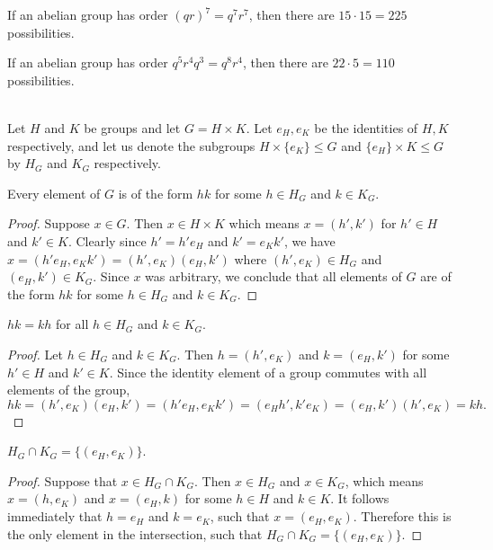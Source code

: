 \documentclass{article}
\newenvironment{problem2}[1]{\noindent {\bf (#1}}
{\medskip}
\newenvironment{problem1}[1]{\noindent {\bf Problem #1:}}
{\medskip}
\begin{document}
\begin{problem2}{ii)} If an abelian group has order $(qr)^7=q^7r^7$, then there are $15\cdot15=225$ possibilities.
\end{problem2}

\begin{problem2}{iii)} If an abelian group has order $q^5r^4q^3=q^8r^4$, then there are $22\cdot5=110$ possibilities.\\
\end{problem2}


\begin{problem1}{50} \\ Let $H$ and $K$ be groups and let $G=H\times K$. Let $e_H,e_K$ be the identities of $H, K$ respectively, and let us denote the subgroups $H\times\{e_K\}\le G$ and $\{e_H\}\times K\le G$ by $H_G$ and $K_G$ respectively. \\\end{problem1}



\begin{problem2}{a)} Every element of $G$ is of the form $hk$ for some $h\in H_G$ and $k\in K_G$.
\end{problem2}

\begin{proof} Suppose $x\in G$. Then $x\in H\times K$ which means $x=(h',k')$ for $h'\in H$ and $k'\in K$. Clearly since $h'=h'e_H$ and $k'=e_Kk'$, we have $x=(h'e_H, e_Kk')=(h',e_K)(e_H,k')$ where $(h',e_K)\in H_G$ and $(e_H,k')\in K_G$. Since $x$ was arbitrary, we conclude that all elements of $G$ are of the form $hk$ for some $h\in H_G$ and $k\in K_G$.
\end{proof}

\begin{problem2}{b)} $hk=kh$ for all $h\in H_G$ and $k\in K_G$.
\end{problem2}

\begin{proof} Let $h\in H_G$ and $k\in K_G$. Then $h=(h',e_K)$ and $k=(e_H,k')$ for some $h'\in H$ and $k'\in K$. Since the identity element of a group commutes with all elements of the group, $$hk=(h',e_K)(e_H,k')=(h'e_H,e_Kk')=(e_Hh', k'e_K)=(e_H,k')(h',e_K)=kh.$$ \end{proof}

\begin{problem2}{c)} $H_G \cap K_G = \{(e_H,e_K)\}$.
\end{problem2}

\begin{proof} Suppose that $x\in H_G \cap K_G $. Then $x\in H_G$ and $x\in K_G$, which means $x=(h,e_K)$ and $x=(e_H,k)$ for some $h\in H$ and $k\in K$. It follows immediately that $h=e_H$ and $k=e_K$, such that $x=(e_H,e_K)$. Therefore this is the only element in the intersection, such that $H_G \cap K_G = \{(e_H,e_K)\}$.
\end{proof}
\end{document}
